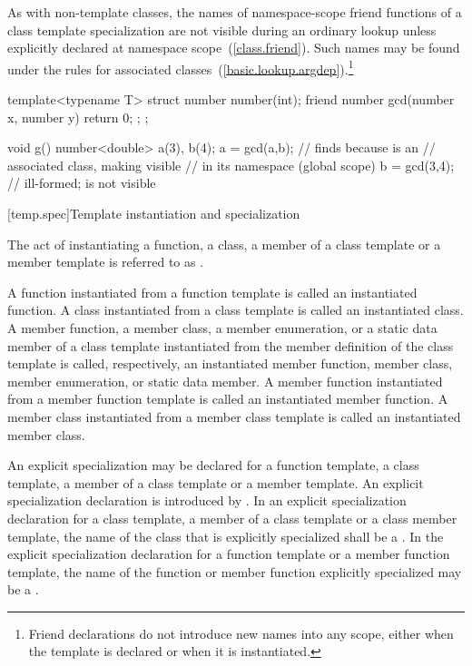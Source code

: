 \pnum
As with non-template classes, the names of namespace-scope friend
functions of a class template specialization are not visible during
an ordinary lookup unless explicitly declared at namespace scope~(\ref{class.friend}).
Such names may be found under the rules for associated
classes~(\ref{basic.lookup.argdep}).\footnote{Friend declarations do not
introduce new names into any scope, either
when the template is declared or when it is instantiated.}
\enterexample
\begin{codeblock}
template<typename T> struct number {
  number(int);
  friend number gcd(number x, number y) { return 0; };
};

void g() {
  number<double> a(3), b(4);
  a = gcd(a,b);     // finds  because  is an
                    // associated class, making  visible
                    // in its namespace (global scope)
  b = gcd(3,4);     // ill-formed;  is not visible
}
\end{codeblock}
\exitexample

[temp.spec]{Template instantiation and specialization}

\pnum
{}%
The act of instantiating a function, a class, a member of a class template or
a member template is referred to as
.

\pnum
A function instantiated from a function template is called an instantiated
function.
A class instantiated from a class template is called an instantiated class.
A member function, a member class, a member enumeration, or a static data member of a class template
instantiated from the member definition of the class template is called,
respectively, an instantiated member function, member class, member enumeration, or static data
member.
A member function instantiated from a member function template is called an
instantiated member function.
A member class instantiated from a member class template is called an
instantiated member class.

\pnum
An explicit specialization may be declared for a function template,
a class template, a member of a class template or a member template.
An explicit specialization declaration is introduced by
.
In an explicit specialization declaration for a class template,
a member of a class template or a class member template,
the name of the class that is explicitly specialized shall be a
.
In the explicit specialization declaration for a function template or
a member function template,
the name of the function or member function explicitly specialized may be a
.
\enterexample

